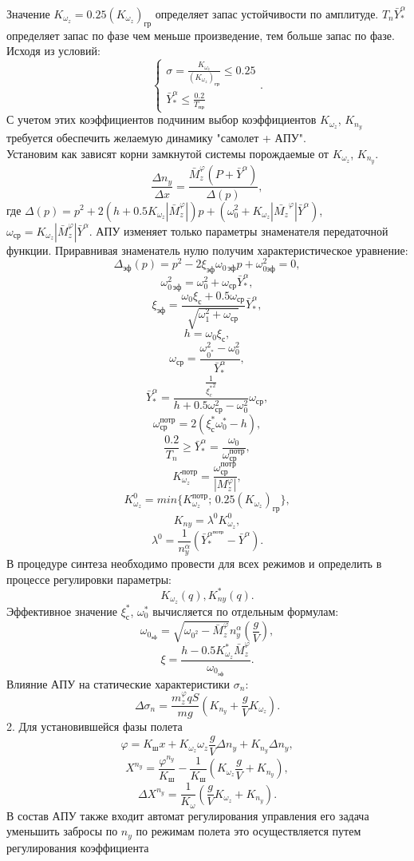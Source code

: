\documentclass{article}
\begin{document}
Значение $K_{\omega_z} = 0.25(K_{\omega_z})_\text{гр}$ определяет запас
устойчивости по амплитуде. $T_n \bar{Y}_*^\alpha$ определяет запас по фазе чем
меньше произведение, тем больше запас по фазе.
Исходя из условий:
\[
	\begin{cases}
		\sigma = \frac{K_{\omega_z}}{(K_{\omega_z})_\text{гр}} \leq 0.25 \\
		\bar{Y}_*^\alpha \leq \frac{0.2}{T_\text{пр}}
	\end{cases}.
\]
С учетом этих коэффициентов подчиним выбор коэффициентов $K_{\omega_z}$,
$K_{n_y}$ требуется обеспечить желаемую динамику "самолет + АПУ".\\
Установим как зависят корни замкнутой системы порождаемые от $K_{\omega_z}$,
$K_{n_y}$.
\[
	\frac{\Delta n_y}{\Delta x} = \frac{\bar{M}_z^\varphi (P +
		\bar{Y}^\alpha)}{\Delta(p)},
\]
где $\Delta(p) = p^2 + 2(h+0.5 K_{\omega_z} |\bar{M}_z^\varphi|)p + (\omega_0^2
	+ K_{\omega_z}|\bar{M_z}^\varphi|\bar{Y}^\alpha)$, $\omega_\text{ср} =
	K_{\omega_z} |\bar{M}_z^\varphi| \bar{Y}^\alpha$.
АПУ изменяет только параметры знаменателя передаточной функции.
Приравнивая знаменатель нулю получим характеристическое уравнение:
\[
	\Delta_\text{эф}(p)= p^2 - 2 \xi_\text{эф}\omega_{0 \, \text{эф}}p +
	\omega_{0 \text{эф}}^2 = 0,
\]
\[
	\omega_{0 \, \text{эф}}^2 = \omega_0^2 + \omega_\text{ср}\bar{Y}^\alpha_*,
\]
\[
	\xi_\text{эф} = \frac{\omega_0 \xi_\text{с}
		+0.5\omega_\text{ср}}{\sqrt{\omega_1^2 + \omega_\text{ср}}}
	\bar{Y}^{\alpha}_* ,
\]
\[
	h = \omega_0 \xi_\text{с},
\]
\[
	\omega_\text{ср}= \frac{\omega_{0^*}^2 - \omega_0^2}{\bar{Y}^{\alpha}_*},
\]
\[
	\bar{Y}^{\alpha}_* = \frac{\frac{1}{{\xi_c^*}^2}}{h + 0.5
		\omega_\text{ср}^2- \omega_0^2}{\omega_\text{ср}},
\]
\[
	\omega_\text{ср}^{\text{потр}} = 2(\xi_\text{с}^* \omega_0^* - h),
\]
\[
	\frac{0.2}{T_n} \geq \bar{Y}^{\alpha}_* =
	\frac{\omega_0}{\omega_\text{ср}^{\text{потр}}},
\]
\[
	K_{\omega_z}^{\text{потр}} =
	\frac{\omega_\text{ср}^{\text{потр}}}{|M_z^{\varphi}|},
\]
\[
	K_{\omega_z}^0 = min\{K_{\omega_z}^{\text{потр}}; \,
	0.25(K_{\omega_z})_\text{гр}\},
\]
\[
	K_{ny}= \lambda^0 K^0_{\omega_z},
\]
\[
	\lambda^0 = \frac{1}{n_y^\alpha}(\bar{Y}^{\alpha^{\text{потр}}}_* -
	\bar{Y}^\alpha).
\]
В процедуре синтеза необходимо провести для всех режимов и определить в
процессе регулировки параметры:
\[
	K_{\omega_z}(q), K_{ny}^*(q).
\]
Эффективное значение $\xi_\text{с}^*$, $\omega_0^*$ вычисляется по отдельным
формулам:
\[
	\omega_{0_\text{эф}} = \sqrt{\omega_{0^{2}} -\bar{M}_z^{\varphi}}
	n_y^{\alpha}(\frac{g}{V}),
\]
\[
	\xi = \frac{h - 0.5 K_{\omega_z}^*
	\bar{M}_z^{\varphi}}{\omega_{0_\text{эф}}}.
\]
Влияние АПУ на статические характеристики $\sigma_n$:
\[
	\Delta \sigma_n = \frac{m_z^\varphi q S}{mg}(K_{n_y} +
	\frac{g}{V}K_{\omega_z}).
\]
2. Для установившейся фазы полета
\[
	\varphi = K_\text{ш}x + K_{\omega_z} \omega_z \frac{g}{V}\Delta n_y +
	K_{n_y} \Delta n_y,
\]
\[
	X^{n_y} = \frac{\varphi^{n_y}}{K_\text{ш}} - \frac{1}{K_\text{ш}}
	(K_{\omega_z} \frac{g}{V} + K_{n_y}),
\]
\[
	\Delta X^{n_y}= \frac{1}{K_\omega} (\frac{g}{V} K_{\omega_z}+ K_{n_y}).
\]
В состав АПУ также входит автомат регулирования управления его задача уменьшить
забросы по $n_y$ по режимам полета это осуществляется путем регулирования
коэффициента
\end{document}
